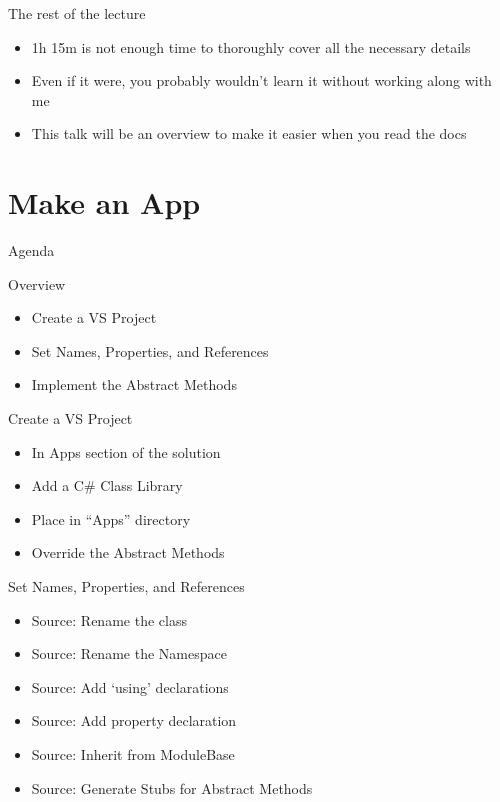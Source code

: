 \documentclass[11pt]{beamer}
\begin{document}
\begin{frame}{The rest of the lecture}
    \begin{itemize}
        \item 1h 15m is not enough time to thoroughly cover all the necessary details
        \item Even if it were, you probably wouldn't learn it without working along with me
        \item This talk will be an overview to make it easier when you read the docs
    \end{itemize}
\end{frame}

\section{Make an App}

\begin{frame}{Agenda}
\tableofcontents
\end{frame}

\begin{frame}{Overview}
    \begin{itemize}
        \item Create a VS Project
        \item Set Names, Properties, and References
        \item Implement the Abstract Methods
    \end{itemize}
\end{frame}

\begin{frame}{Create a VS Project}
    \begin{itemize}
        \item In Apps section of the solution
        \item Add a C\# Class Library
        \item Place in ``Apps'' directory
        \item Override the Abstract Methods
    \end{itemize}
\end{frame}

\begin{frame}{Set Names, Properties, and References}
    \begin{itemize}
        \item Source: Rename the class
        \item Source: Rename the Namespace
        \item Source: Add `using' declarations
        \item Source: Add property declaration
        \item Source: Inherit from ModuleBase
        \item Source: Generate Stubs for Abstract Methods
    \end{itemize}
\end{frame}
\end{document}
